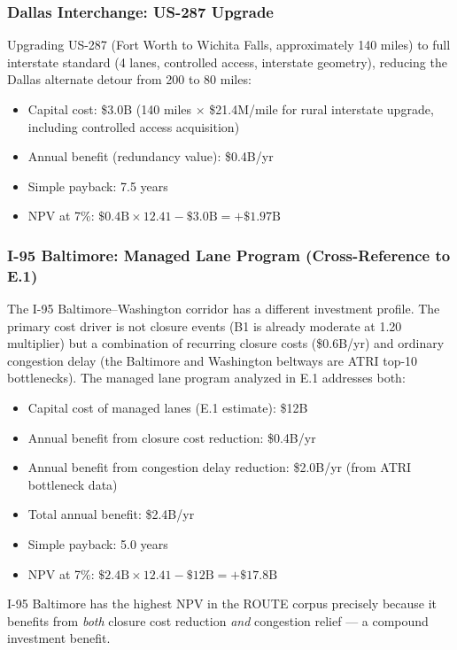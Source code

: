 \subsubsection{Dallas Interchange: US-287 Upgrade}

Upgrading US-287 (Fort Worth to Wichita Falls, approximately 140 miles) to full interstate
standard (4 lanes, controlled access, interstate geometry), reducing the Dallas alternate
detour from 200 to 80 miles:

\begin{itemize}
\item Capital cost: \$3.0B (140 miles $\times$ \$21.4M/mile for rural interstate upgrade,
including controlled access acquisition)
\item Annual benefit (redundancy value): \$0.4B/yr
\item Simple payback: 7.5 years
\item NPV at 7\%: $\$0.4\text{B} \times 12.41 - \$3.0\text{B} = +\$1.97\text{B}$
\end{itemize}

\subsubsection{I-95 Baltimore: Managed Lane Program (Cross-Reference to E.1)}

The I-95 Baltimore--Washington corridor has a different investment profile. The primary
cost driver is not closure events (B1 is already moderate at 1.20 multiplier) but a
combination of recurring closure costs (\$0.6B/yr) and ordinary congestion delay (the
Baltimore and Washington beltways are ATRI top-10 bottlenecks). The managed lane program
analyzed in E.1 \citep{ROUTE_D1} addresses both:

\begin{itemize}
\item Capital cost of managed lanes (E.1 estimate): \$12B
\item Annual benefit from closure cost reduction: \$0.4B/yr
\item Annual benefit from congestion delay reduction: \$2.0B/yr (from ATRI bottleneck data)
\item Total annual benefit: \$2.4B/yr
\item Simple payback: 5.0 years
\item NPV at 7\%: $\$2.4\text{B} \times 12.41 - \$12\text{B} = +\$17.8\text{B}$
\end{itemize}

I-95 Baltimore has the highest NPV in the ROUTE corpus precisely because it benefits from
\textit{both} closure cost reduction \textit{and} congestion relief --- a compound
investment benefit.

